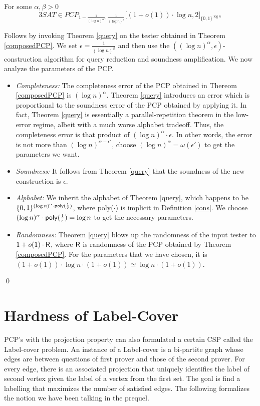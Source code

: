 \begin{theorem}\label{main} 
For some $\alpha, \beta > 0$
\[
  3SAT \in PCP_{1 - \frac{1}{(\log n)^{\alpha'}}, \frac{1}{(\log n)^\beta} } \big[ (1 + o(1) ) \cdot \log n,  2 \big ]_{\{0,1\}^{\log n}}
\]

\end{theorem}
 Follows by invoking Theorem \ref{query} on the
tester obtained in Theorem \ref{composedPCP}. We  set $\epsilon =
\frac{1}{(\log n)^\beta} $ and then use the $((\log n)^\alpha, \epsilon)$-construction algorithm for query
reduction and soundness amplification. We now analyze the parameters
of the PCP.
\begin{itemize}

\item {\em Completeness:} The completeness error of the PCP
  obtained in Thereom \ref{composedPCP} is $(\log n)^\alpha$. Theorem \ref{query}
  introduces an error which is proportional to the soundness error of
  the PCP obtained by applying it. In fact, Theorem \ref{query} is
  essentially a parallel-repetition theorem in the low-error regime,
  albeit with a much worse alphabet tradeoff. Thus, the completeness
  error is that product of $(\log n)^\alpha \cdot \epsilon$. In other words,
  the error is not more than $(\log n)^{\alpha - \epsilon'}$, choose $(\log n)^\alpha =
  \omega(\epsilon')$ to get the parameters we want.

\item {\em Soundness:} It follows from Theorem \ref{query} that the
  soundness of the new construction is $\epsilon$.

\item {\em Alphabet:} We inherit the alphabet of Theorem \ref{query},
  which happens to be $\{0,1\}^{(\log n)^\alpha \cdot 
{\sf poly}(\frac{1}{\epsilon})}$, where {\sf poly}($\cdot$) is
  implicit in Definition \ref{cons}. We choose  ${(\log n)^\alpha \cdot 
{\sf poly}(\frac{1}{\epsilon})} = \log n$ to get the necessary parameters.

\item {\em Randomness:} Theorem \ref{query} blows up the randomness of
  the input tester to ${1 + o(1)} \cdot {\sf R}$, where ${\sf R}$ is
  randomness of the PCP obtained by Theorem \ref{composedPCP}. For the
  parameters that we have chosen, it is $(1 + o(1)) \cdot \log n \cdot (1 + o(1))  
\simeq \log n \cdot (1 + o(1))$.
\end{itemize}
\qed

\section{Hardness of Label-Cover}\label{label-cover} 
PCP's with the 
projection property can also formulated a certain CSP called the {\sc
  Label-cover} problem. An instance of a {\sc Label-cover} is a
bi-partite graph whose edges are between questions of first prover and
those of the second prover. For every edge, there is an associated
projection that uniquely identifies the label of second vertex given
the label of a vertex from the first set. The goal is find a labelling
that maximizes the number of satisfied edges.  The following
formalizes the notion we have been talking in the prequel.

